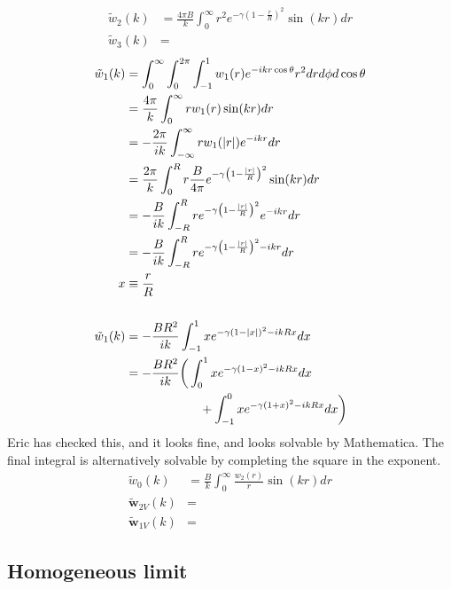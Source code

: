 \documentclass[letterpaper,twocolumn,amsmath,amssymb,prb]{revtex4-1}
\begin{document}
\begin{align}
  \tilde{w}_2(k) &= \frac{4\pi B}{k} \int_{0}^{\infty} r^2 
   e^{-\gamma \left(1- \frac{r}{R} \right)^2} \sin(kr) dr \\
  \tilde{w}_3(k) &=
\end{align}
\begin{align}
  \tilde{w}_1(k) &= \int_0^\infty \int_0^{2\pi} \int_{-1}^{1} w_1(r)
           e^{-ikr\cos\theta} r^2drd\phi d\cos\theta
    \\
    &= \frac{4\pi}{k} \int_0^\infty r w_1(r) \sin(kr) dr
    \\
    &= -\frac{2\pi}{ik} \int_{-\infty}^\infty r w_1(|r|) e^{-ikr} dr
    \\
    &= \frac{2\pi}{k} \int_0^{R} r \frac{B}{4\pi} e^{-\gamma\left(1-\frac{|r|}{R}\right)^2} \sin(kr) dr
    \\
    &= -\frac{B}{ik} \int_{-R}^{R} r e^{-\gamma\left(1-\frac{|r|}{R}\right)^2} e^{-ikr} dr
    \\
    &= -\frac{B}{ik} \int_{-R}^{R} r
    e^{-\gamma\left(1-\frac{|r|}{R}\right)^2 - ikr} dr
    \\
    x &\equiv \frac{r}{R} \\
    \\
    \tilde{w}_1(k) &=
    -\frac{BR^2}{ik} \int_{-1}^{1} x
    e^{-\gamma\left(1-|x|\right)^2 - ikRx} dx
    \\
    &=
    -\frac{BR^2}{ik}
    \bigg(
    \int_{0}^{1} x e^{-\gamma\left(1-x\right)^2 - ikRx} dx
    \notag\\&\quad\quad\quad\quad\quad\quad+
    \int_{-1}^{0} x e^{-\gamma\left(1+x\right)^2 - ikRx} dx
    \bigg)
\end{align}
Eric has checked this, and it looks fine, and looks solvable by
Mathematica.  The final integral is alternatively solvable by
completing the square in the exponent.
\begin{align}
  \tilde{w}_0(k) &= \frac{B}{k} \int_0^\infty \frac{w_2(r)}{r} \sin(kr) dr
    \\
  \mathbf{\tilde{w}}_{2V}(k) &= \\
  \mathbf{\tilde{w}}_{1V}(k) &= 
\end{align}

\subsection{Homogeneous limit}
\end{document}
